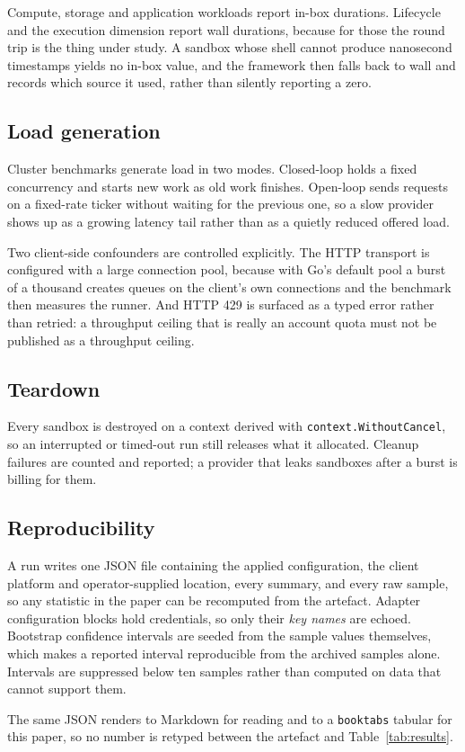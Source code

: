 Compute, storage and application workloads report in-box durations. Lifecycle
and the execution dimension report wall durations, because for those the round
trip is the thing under study. A sandbox whose shell cannot produce
nanosecond timestamps yields no in-box value, and the framework then falls back
to wall and records which source it used, rather than silently reporting a
zero.

\subsection{Load generation}

Cluster benchmarks generate load in two modes. Closed-loop holds a fixed
concurrency and starts new work as old work finishes. Open-loop sends requests
on a fixed-rate ticker without waiting for the previous one, so a slow provider
shows up as a growing latency tail rather than as a quietly reduced offered
load.

Two client-side confounders are controlled explicitly. The HTTP transport is
configured with a large connection pool, because with Go's default pool a
burst of a thousand creates queues on the client's own connections and the
benchmark then measures the runner. And HTTP 429 is surfaced as a typed error
rather than retried: a throughput ceiling that is really an account quota must
not be published as a throughput ceiling.

\subsection{Teardown}

Every sandbox is destroyed on a context derived with
\texttt{context.WithoutCancel}, so an interrupted or timed-out run still
releases what it allocated. Cleanup failures are counted and reported; a
provider that leaks sandboxes after a burst is billing for them.

\subsection{Reproducibility}

A run writes one JSON file containing the applied configuration, the client
platform and operator-supplied location, every summary, and every raw sample,
so any statistic in the paper can be recomputed from the artefact. Adapter
configuration blocks hold credentials, so only their \emph{key names} are
echoed. Bootstrap confidence intervals are seeded from the sample values
themselves, which makes a reported interval reproducible from the archived
samples alone. Intervals are suppressed below ten samples rather than
computed on data that cannot support them.

The same JSON renders to Markdown for reading and to a \texttt{booktabs}
tabular for this paper, so no number is retyped between the artefact and
Table~\ref{tab:results}.
